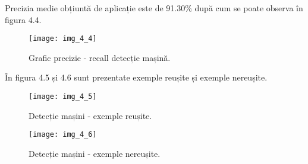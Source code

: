 Precizia medie obțiuntă de aplicație este de 91.30\% după cum se poate observa în figura 4.4.

\begin{figure}[!h]
	\centering
	\texttt{[image: img\_4\_4]}
	\caption{Grafic precizie - recall detecție mașină.}
\end{figure}

În figura 4.5 și 4.6 sunt prezentate exemple reușite și exemple nereușite. 

\begin{figure}[!h]
	\centering
	\texttt{[image: img\_4\_5]}
	\caption{Detecție mașini - exemple reușite.}
\end{figure}
\begin{figure}[!ht]
	\centering
	\texttt{[image: img\_4\_6]}
	\caption{Detecție mașini - exemple nereușite.}
\end{figure}